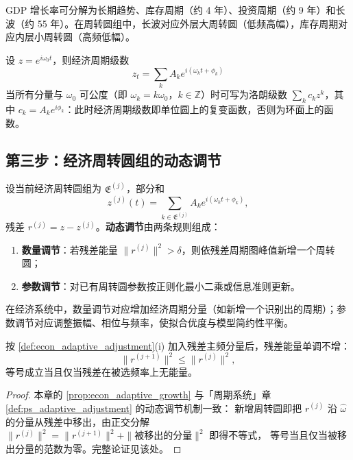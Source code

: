 \begin{example}[经济时间序列的周期级数]\label{ex:econ_series_example}
GDP 增长率可分解为长期趋势、库存周期（约 4 年）、投资周期（约 9 年）和长波（约 55 年）。在周转圆组中，长波对应外层大周转圆（低频高幅），库存周期对应内层小周转圆（高频低幅）。
\end{example}

\begin{remark}[周期级数即复变函数]\label{rem:econ_series_complex}
设 $z=e^{i\omega_0t}$，则经济周期级数
\[
z_t=\sum_k A_k e^{i(\omega_k t+\phi_k)}
\]
当所有分量与 $\omega_0$ 可公度（即 $\omega_k=k\omega_0$，$k\in\mathbb Z$）时可写为洛朗级数 $\sum_k c_k z^k$，其中 $c_k=A_k e^{i\phi_k}$：此时经济周期级数即单位圆上的复变函数，否则为环面上的函数。
\end{remark}

\subsection{第三步：经济周转圆组的动态调节}

\begin{definition}[经济周转圆组的动态调节]\label{def:econ_adaptive_adjustment}
设当前经济周转圆组为 $\mathfrak E^{(j)}$，部分和
\[
z^{(j)}(t)=\sum_{k\in\mathfrak E^{(j)}}A_k e^{i(\omega_k t+\phi_k)},
\]
残差 $r^{(j)}=z-z^{(j)}$。\textbf{动态调节}由两条规则组成：
\begin{enumerate}[label=(\roman*)]
    \item \textbf{数量调节}：若残差能量 $\|r^{(j)}\|^2>\delta$，则依残差周期图峰值新增一个周转圆；
    \item \textbf{参数调节}：对已有周转圆参数按正则化最小二乘或信息准则更新。
\end{enumerate}
在经济系统中，数量调节对应增加经济周期分量（如新增一个识别出的周期）；参数调节对应调整振幅、相位与频率，使拟合优度与模型简约性平衡。
\end{definition}

\begin{proposition}[数量调节的单调性]\label{prop:econ_adaptive_growth}
按 \cref{def:econ_adaptive_adjustment}(i) 加入残差主频分量后，残差能量单调不增：
\[
\|r^{(j+1)}\|^2\le\|r^{(j)}\|^2,
\]
等号成立当且仅当残差在被选频率上无能量。
\end{proposition}

\begin{proof}
本章的 \cref{prop:econ_adaptive_growth} 与「周期系统」章 \cref{def:ps_adaptive_adjustment} 的动态调节机制一致：
新增周转圆即把 $r^{(j)}$ 沿 $\hat\omega$ 的分量从残差中移出，由正交分解
$\|r^{(j)}\|^2=\|r^{(j+1)}\|^2+\|\text{被移出的分量}\|^2$ 即得不等式，
等号当且仅当被移出分量的范数为零。完整论证见该处。
\end{proof}

